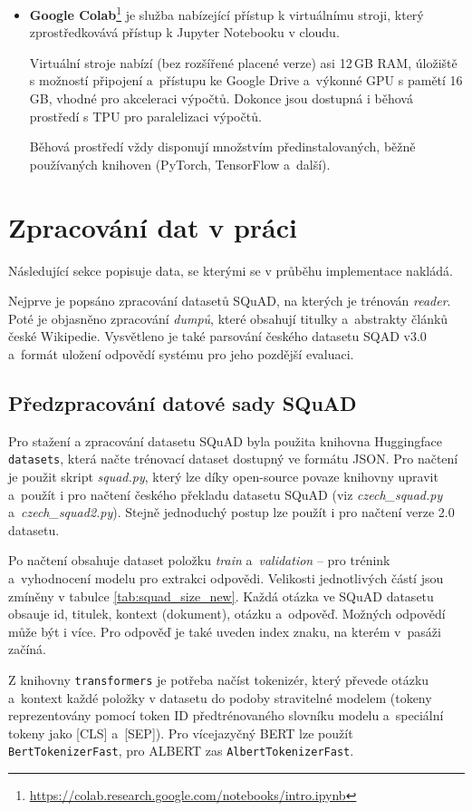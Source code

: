 \begin{itemize}
    \item \textbf{Google Colab}\footnote{\url{https://colab.research.google.com/notebooks/intro.ipynb}}
    je služba nabízející přístup k virtuálnímu stroji, který zprostředkovává přístup k Jupyter Notebooku v cloudu.\par 
    Virtuální stroje nabízí (bez rozšířené placené verze) asi 12\,GB RAM, úložiště s možností připojení a~přístupu ke Google Drive a~výkonné GPU s pamětí 16\,GB, vhodné pro akceleraci výpočtů. Dokonce jsou dostupná i běhová prostředí s TPU pro paralelizaci výpočtů.\par
    Běhová prostředí vždy disponují množstvím předinstalovaných, běžně používaných knihoven (PyTorch, TensorFlow a~další).
    
\end{itemize}

\section{Zpracování dat v práci}
\label{data_processing}
Následující sekce popisuje data, se kterými se v průběhu implementace nakládá. \par
Nejprve je popsáno zpracování datasetů SQuAD, na kterých je trénován \emph{reader}. Poté je objasněno zpracování \textit{dumpů}, které obsahují titulky a~abstrakty článků české Wikipedie. Vysvětleno je také parsování českého datasetu SQAD v3.0 a~formát uložení odpovědí systému pro jeho pozdější evaluaci. 

\subsection{Předzpracování datové sady SQuAD}
Pro stažení a zpracování datasetu SQuAD byla použita knihovna Huggingface \texttt{ datasets}, která načte trénovací dataset dostupný ve formátu JSON. Pro načtení je použit skript \emph{squad.py}, který lze díky open-source povaze knihovny upravit a~použít i pro načtení českého překladu datasetu SQuAD \cite{cz_suqad_download} (viz \emph{czech\_squad.py} a~\emph{czech\_squad2.py}). Stejně jednoduchý postup lze použít i pro načtení verze 2.0 datasetu.\par
Po načtení obsahuje dataset položku \emph{train} a~\emph{validation} -- pro trénink a~vyhodnocení modelu pro extrakci odpovědi. Velikosti jednotlivých částí jsou zmíněny v tabulce \ref{tab:squad_size_new}. Každá otázka ve SQuAD datasetu obsauje id, titulek, kontext (dokument), otázku a~odpověď. Možných odpovědí může být i více. Pro odpověď je také uveden index znaku, na kterém v~pasáži začíná.\par
Z knihovny \texttt{transformers} je potřeba načíst tokenizér, který převede otázku a~kontext každé položky v datasetu do podoby stravitelné modelem (tokeny reprezentovány pomocí token ID předtrénovaného slovníku modelu a~speciální tokeny jako [CLS] a~[SEP]). Pro více\-jazyčný BERT lze použít \texttt{BertTokenizerFast}, pro ALBERT zas \texttt{AlbertTokenizerFast}.\par

